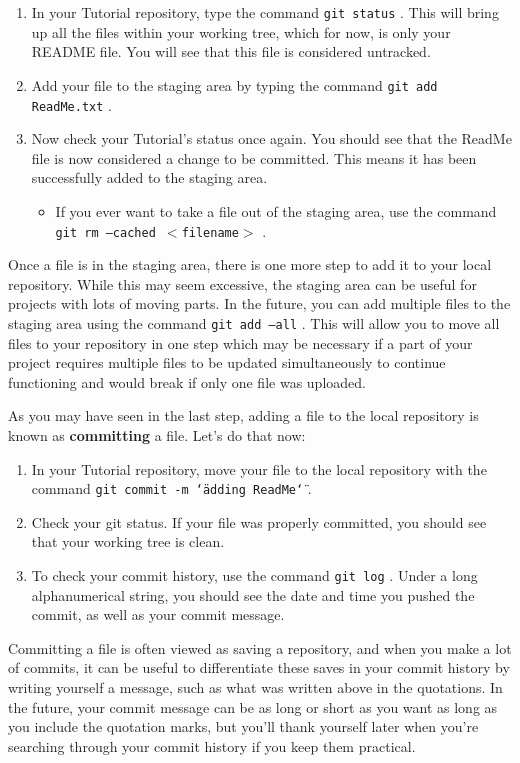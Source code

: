 \documentclass[10pt]{article}
\begin{document}
\begin{enumerate}
\item In your Tutorial repository, type the command \texttt{git status} . This will bring up all the files within your working tree, which for now, is only your README file. You will see that this file is considered untracked. 
\item Add your file to the staging area by typing the command \texttt{git add ReadMe.txt} .
\item Now check your Tutorial's status once again. You should see that the ReadMe file is now considered a change to be committed. This means it has been successfully added to the staging area. 
	\begin{itemize}
	\item If you ever want to take a file out of the staging area, use the command \texttt{git rm --cached $<$filename$>$} .
	\end{itemize}
\end{enumerate}

Once a file is in the staging area, there is one more step to add it to your local repository. While this may seem excessive, the staging area can be useful for projects with lots of moving parts. In the future, you can add multiple files to the staging area using the command \texttt{git add --all} . This will allow you to move all files to your repository in one step which may be necessary if a part of your project requires multiple files to be updated simultaneously to continue functioning and would break if only one file was uploaded. 

As you may have seen in the last step, adding a file to the local repository is known as \textbf{committing} a file. Let's do that now:

\begin{enumerate}
\item In your Tutorial repository, move your file to the local repository with the command \texttt{git commit -m \char`\"adding ReadMe\char`\"} .
\item Check your git status. If your file was properly committed, you should see that your working tree is clean.
\item To check your commit history, use the command \texttt{git log} . Under a long alphanumerical string, you should see the date and time you pushed the commit, as well as your commit message. 
\end{enumerate}

Committing a file is often viewed as saving a repository, and when you make a lot of commits, it can be useful to differentiate these saves in your commit history by writing yourself a message, such as what was written above in the quotations. In the future, your commit message can be as long or short as you want as long as you include the quotation marks, but you'll thank yourself later when you're searching through your commit history if you keep them practical. 
\end{document}
